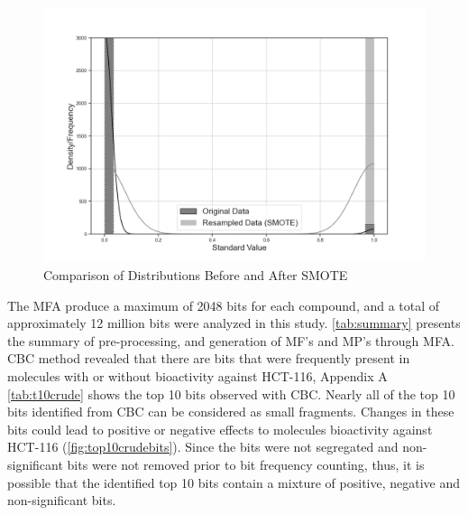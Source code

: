 \FloatBarrier
\begin{figure}[h]
	\centering
	\begin{minipage}{\textwidth}
		\centering
		\includegraphics[width=1\textwidth]{SMOTEbw.png}
		\vspace{-1cm}
		\caption{Comparison of Distributions Before and After SMOTE}
		\label{fig:SMOTE}
	\end{minipage}
\end{figure}
\FloatBarrier


The MFA produce a maximum of 2048 bits for each compound, and a total of approximately 12 million bits were analyzed in this study. \autoref{tab:summary} presents the summary of pre-processing, and generation of MF's and MP's through MFA. CBC method revealed that there are bits that were frequently present in molecules with or without bioactivity against HCT-116, Appendix A \autoref{tab:t10crude} shows the top 10 bits observed with CBC. Nearly all of the top 10 bits identified from CBC can be considered as small fragments. Changes in these bits could lead to positive or negative effects to molecules bioactivity against HCT-116 (\autoref{fig:top10crudebits}). Since the bits were not segregated and non-significant bits were not removed prior to bit frequency counting, thus, it is possible that the identified top 10 bits contain a mixture of positive, negative and non-significant bits. 

